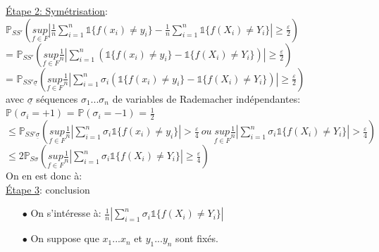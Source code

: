 \documentclass[a4paper]{report}
\begin{document}
\underline{Étape 2: Symétrisation}:\\
$ \mathds{P}_{SS'}(\underset{f\in F}{sup}|\frac{1}{n}\displaystyle {\sum_{i=1}^n}\mathds{1}\{f(x_i)\neq y_i\}-\frac{1}{n}\displaystyle {\sum_{i=1}^n}\mathds{1}\{f(X_i)\neq Y_i\}|\geq \frac{\varepsilon}{2}) $\\
= $ \mathds{P}_{SS'}(\underset{f\in F}{sup}\frac{1}{n}|\displaystyle {\sum_{i=1}^n}(\mathds{1}\{f(x_i)\neq y_i\}-\mathds{1}\{f(X_i)\neq Y_i\})|\geq \frac{\varepsilon}{2}) $\\
= $ \mathds{P}_{SS'\underline{\sigma}}(\underset{f\in F}{sup}\frac{1}{n}|\displaystyle {\sum_{i=1}^n}\sigma_i(\mathds{1}\{f(x_i)\neq y_i\}-\mathds{1}\{f(X_i)\neq Y_i\})|\geq \frac{\varepsilon}{2}) $\\
\newline
avec $\underline{\sigma}$ séquences $\sigma_1...\sigma_n$ de variables de Rademacher indépendantes:\\
$\mathds{P}(\sigma_i=+1)$ = $\mathds{P}(\sigma_i=-1)$ = $\frac{1}{2}$\\
\newline
$\leq \mathds{P}_{SS'\underline{\sigma}}(\underset{f\in F}{sup}\frac{1}{n}|\displaystyle {\sum_{i=1}^n}\sigma_i \mathds{1}\{f(x_i)\neq y_i\}|>\frac{\varepsilon}{4}\ ou\ \underset{f\in F}{sup}\frac{1}{n}|\displaystyle {\sum_{i=1}^n}\sigma_i \mathds{1}\{f(X_i)\neq Y_i\}|>\frac{\varepsilon}{4}) $\\
$\leq 2\mathds{P}_{S\sigma}(\underset{f\in F}{sup}\frac{1}{n}|\displaystyle {\sum_{i=1}^n}\sigma_i \mathds{1}\{f(X_i)\neq Y_i\}|\geq \frac{\varepsilon}{4}) $\\
\newline
On en est donc à:\\
\newline
\underline{Étape 3}: conclusion\\
\begin{itemize}
\item[$\bullet$]On s'intéresse à: $\frac{1}{n}|\displaystyle {\sum_{i=1}^n}\sigma_i \mathds{1}\{f(X_i)\neq Y_i\}|$\\
\item[$\bullet$]On suppose que $x_1...x_n$ et $y_1...y_n$ sont fixés.
\end{itemize}
\end{document}
